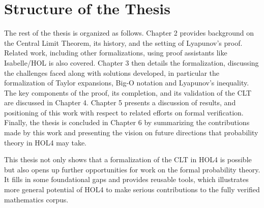 \section{Structure of the Thesis}
The rest of the thesis is organized as follows. Chapter 2 provides background on the Central Limit Theorem, its history, and the setting of Lyapunov's proof. Related work, including other formalizations, using proof assistants like Isabelle/HOL is also covered. Chapter 3 then details the formalization, discussing the challenges faced along with solutions developed, in particular the formalization of Taylor expansions, Big-O notation and Lyapunov's inequality. The key components of the proof, its completion, and its validation of the CLT are discussed in Chapter 4. Chapter 5 presents a discussion of results, and positioning of this work with respect to related efforts on formal verification. Finally, the thesis is concluded in Chapter 6 by summarizing the contributions made by this work and presenting the vision on future directions that probability theory in HOL4 may take.

This thesis not only shows that a formalization of the CLT in HOL4 is possible but also opens up further opportunities for work on the formal probability theory. It fills in some foundational gaps and provides reusable tools, which illustrates more general potential of HOL4 to make serious contributions to the fully verified mathematics corpus.